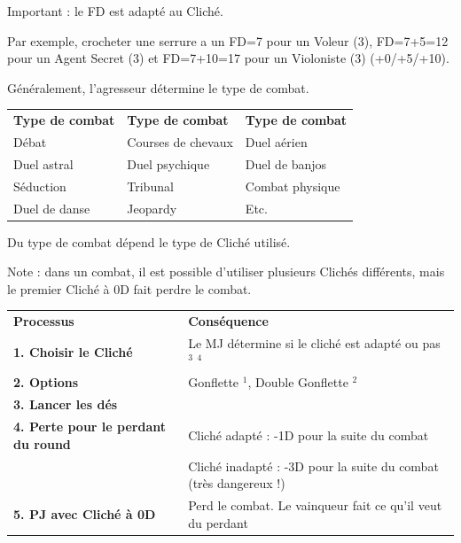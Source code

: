 \begin{frame}[t]
{Important : le FD est adapté au Cliché.

Par exemple, crocheter une serrure a un FD=7 pour un Voleur (3), FD=7+5=12 pour un Agent Secret (3) et FD=7+10=17 pour un Violoniste (3) (+0/+5/+10).



Généralement, l'agresseur détermine le type de combat.

\vspace{0.2cm}

\begin{tabular}{>{\centering\arraybackslash}p{2.6cm}>{\centering\arraybackslash}p{2.6cm}>{\centering\arraybackslash}p{2.6cm}}
\textbf{Type de combat} & \textbf{Type de combat} & \textbf{Type de combat}\\
Débat & Courses de chevaux & Duel aérien \\
Duel astral & Duel psychique & Duel de banjos \\
Séduction & Tribunal & Combat physique \\
Duel de danse & Jeopardy & Etc. \\
\end{tabular}

\vspace{0.2cm}

Du type de combat dépend le type de Cliché utilisé.

Note : dans un combat, il est possible d'utiliser plusieurs Clichés différents, mais le premier Cliché à 0D fait perdre le combat.

}{%


\vspace{0.2cm}

\begin{tabular}{p{3cm}p{5.1cm}}
\textbf{Processus} & \textbf{Conséquence} \\
\textbf{1. Choisir le Cliché} & Le MJ détermine si le cliché est adapté ou pas $^{3}$ $^{4}$ \\
\textbf{2. Options} & Gonflette $^{1}$, Double Gonflette $^{2}$  \\
\textbf{3. Lancer les dés} & \\
\textbf{4. Perte pour le perdant du round}  & Cliché adapté : -1D pour la suite du combat \\
                                   & Cliché inadapté : -3D pour la suite du combat (très dangereux !) \\
\textbf{5. PJ avec Cliché à 0D} & Perd le combat. Le vainqueur fait ce qu'il veut du perdant \\
\end{tabular}

}
\end{frame}
